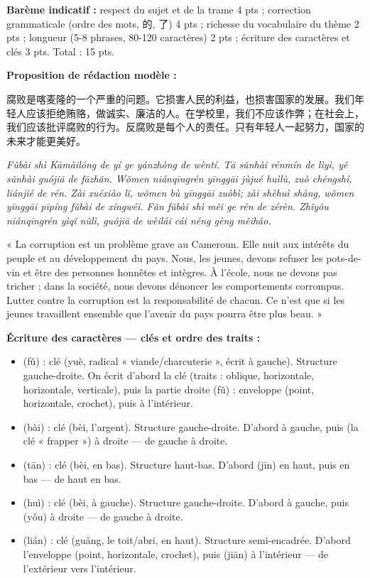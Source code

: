 \documentclass[11pt]{article}
\newcommand{\zh}[1]{\ifmmode\text{#1}\else{#1}\fi}
\begin{document}
\begin{corrige}
\textbf{Barème indicatif :} respect du sujet et de la trame 4 pts ; correction grammaticale (ordre des mots, 的, 了) 4 pts ; richesse du vocabulaire du thème 2 pts ; longueur (5-8 phrases, 80-120 caractères) 2 pts ; écriture des caractères et clés 3 pts. Total : 15 pts.

\textbf{Proposition de rédaction modèle :}

\begin{textebox}
腐败是喀麦隆的一个严重的问题。它损害人民的利益，也损害国家的发展。我们年轻人应该拒绝贿赂，做诚实、廉洁的人。在学校里，我们不应该作弊；在社会上，我们应该批评腐败的行为。反腐败是每个人的责任。只有年轻人一起努力，国家的未来才能更美好。
\end{textebox}

\emph{Fǔbài shì Kāmàilóng de yí ge yánzhòng de wèntí. Tā sǔnhài rénmín de lìyì, yě sǔnhài guójiā de fāzhǎn. Wǒmen niánqīngrén yīnggāi jùjué huìlù, zuò chéngshí, liánjié de rén. Zài xuéxiào lǐ, wǒmen bù yīnggāi zuòbì; zài shèhuì shàng, wǒmen yīnggāi pīpíng fǔbài de xíngwéi. Fǎn fǔbài shì měi ge rén de zérèn. Zhǐyǒu niánqīngrén yìqǐ nǔlì, guójiā de wèilái cái néng gèng měihǎo.}

« La corruption est un problème grave au Cameroun. Elle nuit aux intérêts du peuple et au développement du pays. Nous, les jeunes, devons refuser les pots-de-vin et être des personnes honnêtes et intègres. À l'école, nous ne devons pas tricher ; dans la société, nous devons dénoncer les comportements corrompus. Lutter contre la corruption est la responsabilité de chacun. Ce n'est que si les jeunes travaillent ensemble que l'avenir du pays pourra être plus beau. »

\textbf{Écriture des caractères — clés et ordre des traits :}
\begin{itemize}
\item \zh{腐} (fǔ) : clé \zh{月} (yuè, radical « viande/charcuterie », écrit à gauche). Structure gauche-droite. On écrit d'abord la clé \zh{月} (traits : oblique, horizontale, horizontale, verticale), puis la partie droite \zh{府} (fǔ) : enveloppe \zh{广} (point, horizontale, crochet), puis \zh{付} à l'intérieur.
\item \zh{败} (bài) : clé \zh{贝} (bèi, l'argent). Structure gauche-droite. D'abord \zh{贝} à gauche, puis \zh{攵} (la clé « frapper ») à droite — de gauche à droite.
\item \zh{贪} (tān) : clé \zh{贝} (bèi, en bas). Structure haut-bas. D'abord \zh{今} (jīn) en haut, puis \zh{贝} en bas — de haut en bas.
\item \zh{贿} (huì) : clé \zh{贝} (bèi, à gauche). Structure gauche-droite. D'abord \zh{贝} à gauche, puis \zh{有} (yǒu) à droite — de gauche à droite.
\item \zh{廉} (lián) : clé \zh{广} (guǎng, le toit/abri, en haut). Structure semi-encadrée. D'abord l'enveloppe \zh{广} (point, horizontale, crochet), puis \zh{兼} (jiān) à l'intérieur — de l'extérieur vers l'intérieur.
\end{itemize}


\end{corrige}
\end{document}
